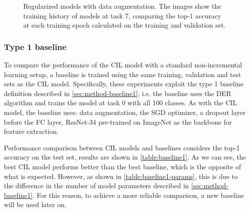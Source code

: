 \begin{figure}[H]
	\centering
	\caption{Regularized models with data augmentation. The images show the training history of models at task 7, comparing the top-1 accuracy at each training epoch calculated on the training and validation set.}
	\label{fig:exp2-train_val}%
\end{figure}

\subsubsection{Type 1 baseline}
To compare the performance of the CIL model with a standard non-incremental learning setup, a baseline is trained using the same training, validation and test sets as the CIL model.
Specifically, these experiments exploit the type 1 baseline definition described in \autoref{sec:method-baseline1}, i.e. the baseline uses the DER algorithm and trains the model at task 0 with all 100 classes.
As with the CIL model, the baseline uses: data augmentation, the SGD optimizer, a dropout layer before the FC layer, ResNet-34 pre-trained on ImageNet as the backbone for feature extraction.

Performance comparison between CIL models and baselines considers the top-1 accuracy on the test set, results are shown in \autoref{table:baseline1}.
As we can see, the best CIL model performs better than the best baseline, which is the opposite of what is expected.
However, as shown in \autoref{table:baseline1-params}, this is due to the difference in the number of model parameters described in \autoref{sec:method-baseline1}.
For this reason, to achieve a more reliable comparison, a new baseline will be used later on.


